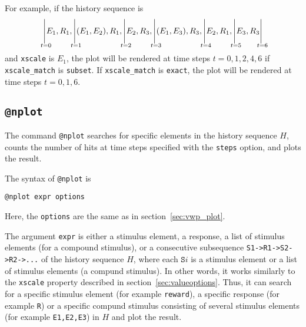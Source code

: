 \documentclass[11pt]{article}
\begin{document}
For example, if the history sequence is
\[
\Biggr|_{\mathclap{\substack{\\ \\ t=0}}} E_1, R_1,
\Biggr|_{\mathclap{\substack{\\ \\ t=1}}} (E_1,E_2), R_1,
\Biggr|_{\mathclap{\substack{\\ \\ t=2}}} E_2, R_3,
\Biggr|_{\mathclap{\substack{\\ \\ t=3}}} (E_1,E_3), R_3,
\Biggr|_{\mathclap{\substack{\\ \\ t=4}}} E_2, R_1,
\Biggr|_{\mathclap{\substack{\\ \\ t=5}}} E_3, R_3
\Biggr|_{\mathclap{\substack{\\ \\ t=6}}}
\]
and \verb|xscale| is $E_1$, the plot will be rendered at time steps $t=0, 1, 2, 4, 6$ if \verb|xscale_match| is \verb|subset|. If \verb|xscale_match| is \verb|exact|, the plot will be rendered at time steps $t=0, 1, 6$.

\subsection{\texttt{@nplot}}
The command \verb|@nplot| searches for specific elements in the history sequence $H$, counts the number of hits at time steps specified with the \verb|steps| option, and plots the result. 

The syntax of \verb|@nplot| is
\begin{lstlisting}[caption={Syntax for \texttt{@nplot}}, label=lst:n_plot_syntax]
@nplot expr options
\end{lstlisting}
Here, the \verb|options| are the same as in section~\ref{sec:vwp_plot}.

The argument \verb|expr| is either a stimulus element, a response, a list of stimulus elements (for a compound stimulus), or a consecutive subsequence \texttt{S1->R1->S2->R2->...} of the history sequence $H$, where each $\texttt{S}i$ is a stimulus element or a list of stimulus elements (a compund stimulus). In other words, it works similarly to the \verb|xscale| property described in section~\ref{sec:valueoptions}. Thus, it can search for a specific stimulus element (for example \verb|reward|), a specific response (for example \verb|R|) or a specific compund stimulus consisting of several stimulus elements (for example \verb|E1,E2,E3|) in $H$ and plot the result. 
\end{document}
